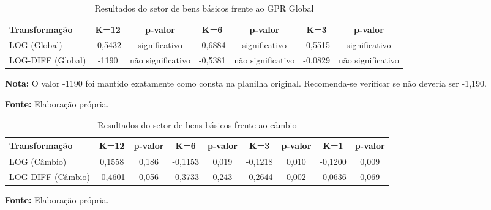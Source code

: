\clearpage

\begin{table}[H]
\centering
\caption{Resultados do setor de bens básicos frente ao GPR Global}
\label{tab:bens-basicos-gpr-global}
\small
\begin{adjustbox}{max width=\textwidth}
\begin{tabular}{@{}lcccccc@{}}
\toprule
Transformação & K=12 & p-valor & K=6 & p-valor & K=3 & p-valor \\
\midrule
LOG (Global) & -0,5432 & significativo & -0,6884 & significativo & -0,5515 & significativo \\
LOG-DIFF (Global) & -1190 & não significativo & -0,5381 & não significativo & -0,0829 & não significativo \\
\bottomrule
\end{tabular}
\end{adjustbox}
\vspace{1mm}
\begin{minipage}{\textwidth}
\footnotesize
\textbf{Nota:} O valor -1190 foi mantido exatamente como consta na planilha original. Recomenda-se verificar se não deveria ser -1,190.\par
\textbf{Fonte:} Elaboração própria.
\end{minipage}
\end{table}

\begin{table}[H]
\centering
\caption{Resultados do setor de bens básicos frente ao câmbio}
\label{tab:bens-basicos-cambio}
\small
\begin{adjustbox}{max width=\textwidth}
\begin{tabular}{@{}lcccccccc@{}}
\toprule
Transformação & K=12 & p-valor & K=6 & p-valor & K=3 & p-valor & K=1 & p-valor \\
\midrule
LOG (Câmbio) & 0,1558 & 0,186 & -0,1153 & 0,019 & -0,1218 & 0,010 & -0,1200 & 0,009 \\
LOG-DIFF (Câmbio) & -0,4601 & 0,056 & -0,3733 & 0,243 & -0,2644 & 0,002 & -0,0636 & 0,069 \\
\bottomrule
\end{tabular}
\end{adjustbox}
\vspace{1mm}
\begin{minipage}{\textwidth}
\footnotesize
\textbf{Fonte:} Elaboração própria.
\end{minipage}
\end{table}

